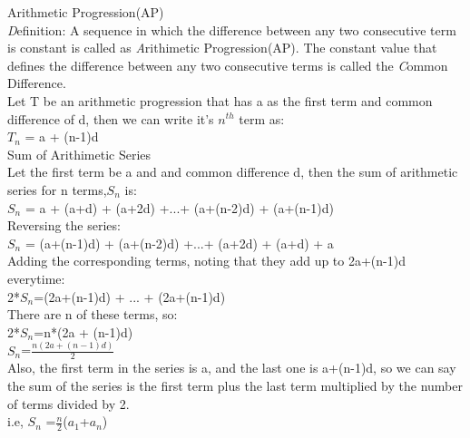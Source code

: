 \documentclass{article}
\begin{document}
 {\Large Arithmetic Progression(AP)}
 \vspace{2mm}
 \\
 {\emph Definition:} \hspace{2mm}A sequence in which the difference between any two consecutive term is constant is called as {\emph Arithimetic Progression(AP)}.
 The constant value that defines the difference between any two consecutive terms is called the {\emph Common Difference}.
 \\ Let T be an arithmetic progression that has a as the first term and common difference of d, then we can write it's $n^{th}$ term as:
 \\$T_{n}$ = a + (n-1)d
\vspace{4mm} \\ 
 {\large Sum of Arithimetic Series}
 \vspace{2mm}
\\Let the first term be a and and common difference d, then the sum of arithmetic series for n terms,$S_{n}$ is:
\\$S_{n}$ = a + (a+d) + (a+2d) +...+ (a+(n-2)d) + (a+(n-1)d) 
\\Reversing the series:
\\$S_{n}$ = (a+(n-1)d) + (a+(n-2)d) +...+ (a+2d) + (a+d) + a
\\Adding the corresponding terms, noting that they add up to 2a+(n-1)d everytime:
\\2*$S_{n}$=(2a+(n-1)d) + ... + (2a+(n-1)d)
\\There are n of these terms, so:
\\ \vspace{0.8mm} 2*$S_{n}$=n*(2a + (n-1)d)
\\ \vspace{0.8mm} $S_{n}$=$\frac{n(2a + (n-1)d)}{2}$
\\Also, the first term in the series is a, and the last one is a+(n-1)d,
so we can say the sum of the series is the first term plus the last term multiplied by the number of terms divided by 2.
\\\vspace{0.8mm}i.e, $S_{n}$ =$\frac{n}{2}$($a_{1}$+$a_{n}$)
\end{document}
